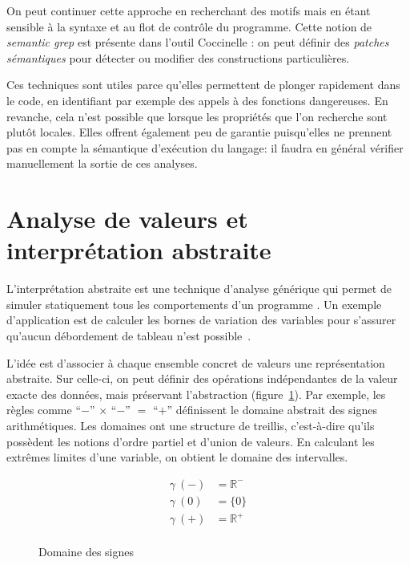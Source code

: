 On peut continuer cette approche en recherchant des motifs mais en étant
sensible à la syntaxe et au flot de contrôle du programme. Cette notion de
\emph{semantic grep} est présente dans l'outil Coccinelle
\cite{coccinelle09,coccinelle11}: on peut définir des
\emph{patches sémantiques} pour détecter ou modifier des constructions
particulières.

Ces techniques sont utiles parce qu'elles permettent de plonger rapidement dans
le code, en identifiant par exemple des appels à des fonctions dangereuses. En
revanche, cela n'est possible que lorsque les propriétés que l'on recherche sont
plutôt locales. Elles offrent également peu de garantie puisqu'elles ne prennent
pas en compte la sémantique d'exécution du langage: il faudra en général
vérifier manuellement la sortie de ces analyses.

\section{Analyse de valeurs et interprétation abstraite}
\label{sec:absint}

L'interprétation abstraite est une technique d'analyse générique qui permet de
simuler statiquement tous les comportements d'un programme
\cite{Cousot77,Cousot92-1}. Un exemple d'application est de calculer les bornes
de variation des variables pour s'assurer qu'aucun débordement de tableau n'est
possible~\cite{AllamigeonHymansSSTIC07}.

L'idée est d'associer à chaque ensemble concret de valeurs une représentation
abstraite. Sur celle-ci, on peut définir des opérations indépendantes de la
valeur exacte des données, mais préservant l'abstraction
(figure~\ref{fig:dom-sig}). Par exemple, les règles comme
\enquote{$-$} $×$ \enquote{$-$} $=$ \enquote{$+$}
définissent le domaine abstrait des signes arithmétiques. Les domaines ont une
structure de treillis, c'est-à-dire qu'ils possèdent les notions d'ordre partiel
et d'union de valeurs. En calculant les extrêmes limites d'une variable, on
obtient le domaine des intervalles.

\begin{figure}[h]%
\centering

\begin{minipage}{0.4\textwidth}
\end{minipage}
\begin{minipage}{0.4\textwidth}
  \begin{align*}
  γ~(-) &= ℝ^- \\
  γ~(0) &= \{0\} \\
  γ~(+) &= ℝ^+ \\
  \end{align*}
\end{minipage}

\caption{Domaine des signes}
\label{fig:dom-sig}
\end{figure}%

